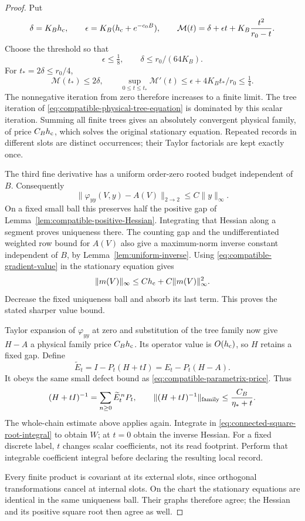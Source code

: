\documentclass[11pt,reqno]{amsart}
\numberwithin{equation}{section}
\theoremstyle{definition}
\theoremstyle{remark}
\begin{document}
\begin{proof}
Put
\[
 \delta=K_Bh_{\rm c},\qquad
 \epsilon=K_B(h_{\rm c}+e^{-c_0B}),\qquad
 \mathcal M(t)=\delta+\epsilon t
                              +K_B\frac{t^2}{r_0-t}.
\]
Choose the threshold so that
\[
                    \epsilon\le\tfrac18,\qquad
                    \delta\le r_0/(64K_B).
\]
For \(t_*=2\delta\le r_0/4\),
\[
       \mathcal M(t_*)\le2\delta,\qquad
       \sup_{0\le t\le t_*}\mathcal M'(t)
                    \le\epsilon+4K_Bt_*/r_0\le\tfrac14 .
\]
The nonnegative iteration from zero
therefore increases to a finite limit.
The tree iteration of
\eqref{eq:compatible-physical-tree-equation}
is dominated by this scalar iteration.
Summing all finite trees gives an
absolutely convergent physical family,
of price \(C_Bh_{\rm c}\), which solves
the original stationary equation.
Repeated records in different slots are
distinct occurrences; their Taylor
factorials are kept exactly once.

The third fine derivative has a uniform
order-zero rooted budget independent
of \(B\). Consequently
\[
       \|\varphi_{yy}(V,y)-A(V)\|_{2\to2}
                                      \le C\|y\|_\infty .
\]
On a fixed small ball this preserves
half the positive gap of
Lemma~\ref{lem:compatible-positive-Hessian}.
Integrating that Hessian along a segment
proves uniqueness there.
The counting gap and the undifferentiated
weighted row bound for \(A(V)\) also give
a maximum-norm inverse constant independent
of \(B\), by
Lemma~\ref{lem:uniform-inverse}.
Using \eqref{eq:compatible-gradient-value}
in the stationary equation gives
\[
       \|m(V)\|_\infty
           \le Ch_{\rm c}+C\|m(V)\|_\infty^2 .
\]
Decrease the fixed uniqueness ball and
absorb its last term. This proves the
stated sharper value bound.

Taylor expansion of \(\varphi_{yy}\) at
zero and substitution of the tree family
now give \(H-A\) a physical family
price \(C_Bh_{\rm c}\).
Its operator value is \(O(h_{\rm c})\),
so \(H\) retains a fixed gap.
Define
\[
      \widetilde E_t
           =I-P_t(H+tI)
           =E_t-P_t(H-A).
\]
It obeys the same small defect bound
as \eqref{eq:compatible-parametrix-price}.
Thus
\begin{equation}
       (H+tI)^{-1}
             =\sum_{n\ge0}\widetilde E_t^{\,n}P_t,\qquad
       \|(H+tI)^{-1}\|_{\rm family}
                                      \le\frac{C_B}{\eta_*+t}.
 \label{eq:compatible-stationary-resolvent}
\end{equation}
The whole-chain estimate above applies
again. Integrate in
\eqref{eq:connected-square-root-integral}
to obtain \(W\); at \(t=0\) obtain the
inverse Hessian.
For a fixed discrete label, \(t\)
changes scalar coefficients, not its
read footprint. Perform that integrable
coefficient integral before declaring
the resulting local record.

Every finite product is covariant at
its external slots, since orthogonal
transformations cancel at internal slots.
On the chart the stationary equations
are identical in the same uniqueness
ball. Their graphs therefore agree;
the Hessian and its positive square
root then agree as well.
\end{proof}
\end{document}
